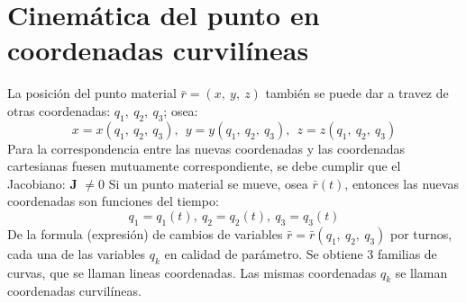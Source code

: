 \documentclass[11pt]{article}
\begin{document}
\section{Cinemática del punto en coordenadas curvilíneas}
La posición del punto material $\bar{r} = (x,\ y,\ z)$ también se puede dar a travez de otras coordenadas: $q_1,\ q_2,\ q_3$; osea:
\begin{equation*}
x = x(q_1,\ q_2,\ q_3),\ \ y = y(q_1,\ q_2,\ q_3), \ \ z = z(q_1,\ q_2,\ q_3)
\end{equation*}
Para la correspondencia entre las nuevas coordenadas y las coordenadas cartesianas fuesen mutuamente correspondiente, se debe cumplir que el Jacobiano: \textbf{J} $\neq 0$
Si un punto material se mueve, osea $\bar{r}(t)$, 	entonces las nuevas coordenadas son funciones del tiempo:
\begin{equation*}
q_1 = q_1(t),\ q_2 = q_2(t),\ q_3 = q_3(t)
\end{equation*}
De la formula (expresión) de cambios de variables $\bar{r} = \bar{r}(q_1,\ q_2,\ q_3)$ por turnos, cada una de las variables $q_k$ en calidad de parámetro. Se obtiene 3 familias de curvas, que se llaman lineas coordenadas.
Las mismas coordenadas $q_k$ se llaman coordenadas curvilíneas. \\
\end{document}

